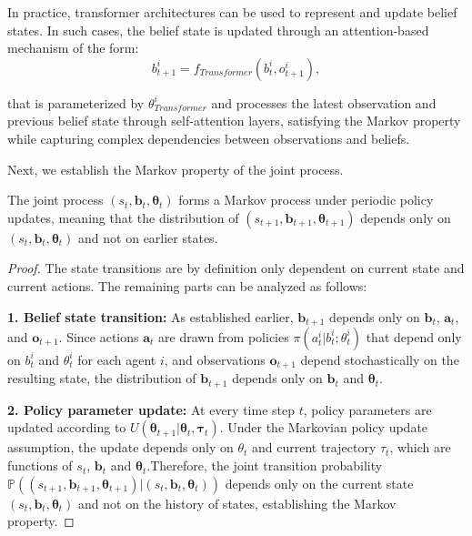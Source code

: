\begin{remark}
    In practice, transformer architectures can be used to represent and
    update belief states. In such cases, the belief state is updated
    through an attention-based mechanism of the form:
    \begin{equation}
        b_{t+1}^{i} = f_{{Transformer}}(b_{t}^{i}, o_{t+1}^{i}),
    \end{equation}

    that is parameterized by $\theta_{Transformer}^{i}$ and processes the latest
    observation and previous belief state through self-attention layers, satisfying the Markov property
    while capturing complex dependencies between observations and beliefs.
\end{remark}
Next, we establish the Markov property of the joint process.
\begin{lemma}
    The joint process $(s_{t}, \boldsymbol{b}_{t}, \boldsymbol{\theta}_{t})$ forms
    a Markov process under periodic policy updates, meaning that the distribution
    of $(s_{t+1}, \boldsymbol{b}_{t+1}, \boldsymbol{\theta}_{t+1})$ depends only
    on $(s_{t}, \boldsymbol{b}_{t}, \boldsymbol{\theta}_{t})$ and not on earlier
    states.
\end{lemma}
\begin{proof}
    The state transitions are by definition only dependent on current state and current
    actions. The remaining parts can be analyzed as follows:

    \textbf{1. Belief
        state transition:} As established earlier, $\boldsymbol{b}_{t+1}$ depends only
    on $\boldsymbol{b}_{t}$, $\boldsymbol{a}_{t}$, and $\boldsymbol{o}_{t+1}$. Since
    actions $\boldsymbol{a}_{t}$ are drawn from policies $\pi(a_{t}^{i}|b_{t}^{i};
        \theta_{t}^{i})$ that depend only on $b_{t}^{i}$ and $\theta_{t}^{i}$ for each
    agent $i$, and observations $\boldsymbol{o}_{t+1}$ depend stochastically on
    the resulting state, the distribution of $\boldsymbol{b}_{t+1}$ depends only on
    $\boldsymbol{b}_{t}$ and $\boldsymbol{\theta}_{t}$.

    \textbf{2. Policy parameter
        update:} At every time step $t$, policy parameters are updated according to $U(
        \boldsymbol{\theta}_{t+1}|\boldsymbol{\theta}_{t}, \boldsymbol{\tau}_{t})$.
    Under the Markovian policy update assumption, the update depends only on $\theta
        _{t}$ and current trajectory $\tau_{t}$, which are functions of $s_{t}$, $\boldsymbol
        {b}_{t}$ and $\boldsymbol{\theta}_{t}$.Therefore, the joint transition
    probability
    $\mathbb{P}((s_{t+1}, \boldsymbol{b}_{t+1}, \boldsymbol{\theta}_{t+1})|(s_{t}, \boldsymbol
        {b}_{t}, \boldsymbol{\theta}_{t}))$
    depends only on the current state
    $(s_{t}, \boldsymbol{b}_{t}, \boldsymbol{\theta}_{t})$ and not on the history
    of states, establishing the Markov property.
\end{proof}
